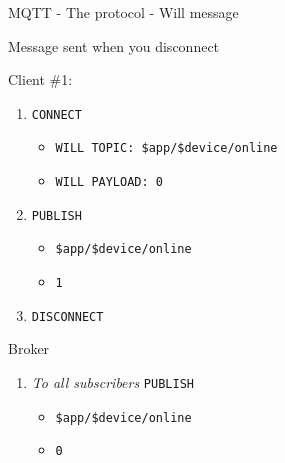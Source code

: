 \begin{frame}[fragile]{MQTT - The protocol - Will message}
\protect\hypertarget{mqtt---the-protocol---will-message}{}

Message sent when you disconnect

Client \#1:

\begin{enumerate}
[1.]
\tightlist
\item
  \texttt{CONNECT}

  \begin{itemize}
  \tightlist
  \item
    \texttt{WILL\ TOPIC:\ \$app/\$device/online}
  \item
    \texttt{WILL\ PAYLOAD:\ 0}
  \end{itemize}
\item
  \texttt{PUBLISH}

  \begin{itemize}
  \tightlist
  \item
    \texttt{\$app/\$device/online}
  \item
    \texttt{1}
  \end{itemize}
\item
  \texttt{DISCONNECT}
\end{enumerate}

Broker

\begin{enumerate}
[1.]
\tightlist
\item
  \emph{To all subscribers} \texttt{PUBLISH}

  \begin{itemize}
  \tightlist
  \item
    \texttt{\$app/\$device/online}
  \item
    \texttt{0}
  \end{itemize}
\end{enumerate}

\end{frame}


